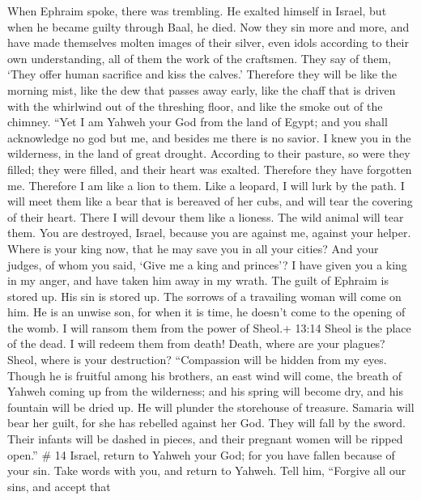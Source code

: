  When Ephraim spoke, there was trembling. He exalted himself
in Israel, but when he became guilty through Baal, he died. 
Now they sin more and more, and have made themselves molten images of
their silver, even idols according to their own understanding, all of
them the work of the craftsmen. They say of them, `They offer human
sacrifice and kiss the calves.'  Therefore they will be like
the morning mist, like the dew that passes away early, like the chaff
that is driven with the whirlwind out of the threshing floor, and like
the smoke out of the chimney.  ``Yet I am Yahweh your God
from the land of Egypt; and you shall acknowledge no god but me, and
besides me there is no savior.  I knew you in the
wilderness, in the land of great drought.  According to
their pasture, so were they filled; they were filled, and their heart
was exalted. Therefore they have forgotten me.  Therefore I
am like a lion to them. Like a leopard, I will lurk by the path.
 I will meet them like a bear that is bereaved of her cubs,
and will tear the covering of their heart. There I will devour them like
a lioness. The wild animal will tear them.  You are
destroyed, Israel, because you are against me, against your helper.
 Where is your king now, that he may save you in all your
cities? And your judges, of whom you said, `Give me a king and princes'?
 I have given you a king in my anger, and have taken him
away in my wrath.  The guilt of Ephraim is stored up. His
sin is stored up.  The sorrows of a travailing woman will
come on him. He is an unwise son, for when it is time, he doesn't come
to the opening of the womb.  I will ransom them from the
power of Sheol.+ 13:14 Sheol is the place of the dead. I will redeem
them from death! Death, where are your plagues? Sheol, where is your
destruction? ``Compassion will be hidden from my eyes. 
Though he is fruitful among his brothers, an east wind will come, the
breath of Yahweh coming up from the wilderness; and his spring will
become dry, and his fountain will be dried up. He will plunder the
storehouse of treasure.  Samaria will bear her guilt, for
she has rebelled against her God. They will fall by the sword. Their
infants will be dashed in pieces, and their pregnant women will be
ripped open.'' \# 14  Israel, return to Yahweh your God; for
you have fallen because of your sin.  Take words with you,
and return to Yahweh. Tell him, ``Forgive all our sins, and accept that
